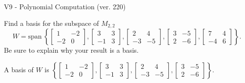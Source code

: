 \begin{exercise}
  \begin{exerciseTitle}V9 - Polynomial Computation (ver. 220)\end{exerciseTitle}
  \begin{exerciseStatement}
    Find a basis for the subspace of \(M_{2,2}\) 
\[W=\mathrm{span}\ \left\{\left[\begin{array}{cc}
1 & -2 \\
-2 & 0
\end{array}\right] , \left[\begin{array}{cc}
3 & 3 \\
-1 & 3
\end{array}\right] , \left[\begin{array}{cc}
2 & 4 \\
-3 & -5
\end{array}\right] , \left[\begin{array}{cc}
3 & -5 \\
2 & -6
\end{array}\right] , \left[\begin{array}{cc}
7 & 4 \\
-4 & 6
\end{array}\right]\right\}.\]
 Be sure to explain why your result is a basis.


  \end{exerciseStatement}
  \begin{exerciseAnswer}
   A basis of \(W\) is  \(\left\{\left[\begin{array}{cc}
1 & -2 \\
-2 & 0
\end{array}\right] , \left[\begin{array}{cc}
3 & 3 \\
-1 & 3
\end{array}\right] , \left[\begin{array}{cc}
2 & 4 \\
-3 & -5
\end{array}\right] , \left[\begin{array}{cc}
3 & -5 \\
2 & -6
\end{array}\right]\right\}\).
  


  \end{exerciseAnswer}
\end{exercise}